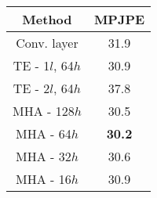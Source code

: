 \begin{center}
\begin{tabular}{|c|c|}
\hline

\textbf{Method} & \textbf{MPJPE} \\

\hline
Conv. layer & 31.9 \\
\hline
TE - 1$l$, 64$h$ & 30.9 \\
\hline
TE - 2$l$, 64$h$ & 37.8 \\
\hline
MHA - 128$h$ & 30.5 \\
\hline
MHA - 64$h$ & \textbf{30.2} \\
\hline
MHA - 32$h$ & 30.6 \\
\hline
MHA - 16$h$ & 30.9 \\
\hline

\end{tabular}
\end{center}
